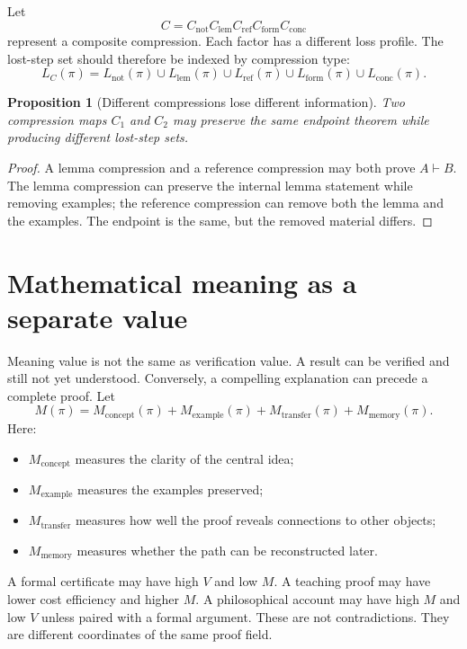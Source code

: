 \documentclass[11pt,oneside]{book}
\newtheorem{proposition}[definition]{Proposition}
\theoremstyle{remark}
\begin{document}
Let
\[
        C=C_{\mathrm{not}}C_{\mathrm{lem}}C_{\mathrm{ref}}C_{\mathrm{form}}C_{\mathrm{conc}}
\]
represent a composite compression.  Each factor has a different loss profile.  The lost-step set should therefore be indexed by compression type:
\[
        L_C(\pi)=L_{\mathrm{not}}(\pi)\cup L_{\mathrm{lem}}(\pi)\cup L_{\mathrm{ref}}(\pi)\cup L_{\mathrm{form}}(\pi)\cup L_{\mathrm{conc}}(\pi).
\]

\begin{proposition}[Different compressions lose different information]
Two compression maps $C_1$ and $C_2$ may preserve the same endpoint theorem while producing different lost-step sets.
\end{proposition}

\begin{proof}
A lemma compression and a reference compression may both prove $A\vdash B$.  The lemma compression can preserve the internal lemma statement while removing examples; the reference compression can remove both the lemma and the examples.  The endpoint is the same, but the removed material differs.
\end{proof}

\section{Mathematical meaning as a separate value}

Meaning value is not the same as verification value.  A result can be verified and still not yet understood.  Conversely, a compelling explanation can precede a complete proof.  Let
\[
        M(\pi)=M_{\mathrm{concept}}(\pi)+M_{\mathrm{example}}(\pi)+M_{\mathrm{transfer}}(\pi)+M_{\mathrm{memory}}(\pi).
\]
Here:
\begin{itemize}
\item $M_{\mathrm{concept}}$ measures the clarity of the central idea;
\item $M_{\mathrm{example}}$ measures the examples preserved;
\item $M_{\mathrm{transfer}}$ measures how well the proof reveals connections to other objects;
\item $M_{\mathrm{memory}}$ measures whether the path can be reconstructed later.
\end{itemize}

A formal certificate may have high $V$ and low $M$.  A teaching proof may have lower cost efficiency and higher $M$.  A philosophical account may have high $M$ and low $V$ unless paired with a formal argument.  These are not contradictions.  They are different coordinates of the same proof field.
\end{document}
